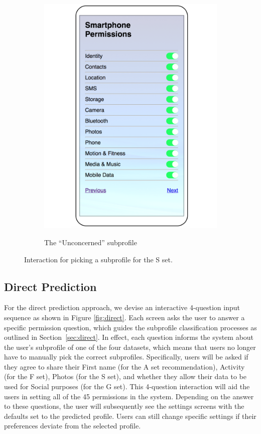 \begin{figure}
\begin{subfigure}[b]{0.22\textheight}
		\includegraphics[width=0.2\textheight]{figures/pickprofile2.pdf}
		\label{fig:ppc}
		\caption{The ``Unconcerned'' subprofile}
	\end{subfigure}
	\caption{Interaction for picking a subprofile for the S set.}
	\label{fig:pp}
\end{figure}


\subsection{Direct Prediction}

For the direct prediction approach, we devise an interactive 4-question input sequence as shown in Figure \ref{fig:direct}. Each screen asks the user to answer a specific permission question, which guides the subprofile classification processes as outlined in Section~\ref{sec:direct}. In effect, each question informs the system about the user's subprofile of one of the four datasets, which means that users no longer have to manually pick the correct subprofiles. Specifically, users will be asked if they agree to share their First name (for the A set recommendation), Activity (for the F set), Photos (for the S set), and whether they allow their data to be used for Social purposes (for the G set). This 4-question interaction will aid the users in setting all of the 45 permissions in the system. Depending on the answer to these questions, the user will subsequently see the settings screens with the defaults set to the predicted profile. Users can still change specific settings if their preferences deviate from the selected profile.

